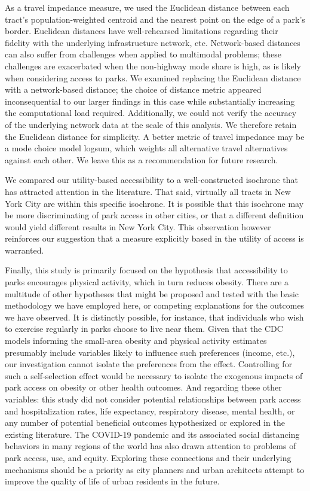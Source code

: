 \documentclass[shortAfour,sageh.bst]{sagej}
\begin{document}
As a travel impedance measure, we used the Euclidean distance between
each tract's population-weighted centroid and the nearest point on the
edge of a park's border. Euclidean distances have well-rehearsed
limitations regarding their fidelity with the underlying infrastructure
network, etc. Network-based distances can also suffer from challenges
when applied to multimodal problems; these challenges are exacerbated
when the non-highway mode share is high, as is likely when considering
access to parks. We examined replacing the Euclidean distance with a
network-based distance; the choice of distance metric appeared
inconsequential to our larger findings in this case while substantially
increasing the computational load required. Additionally, we could not
verify the accuracy of the underlying network data at the scale of this
analysis. We therefore retain the Euclidean distance for simplicity. A
better metric of travel impedance may be a mode choice model logsum,
which weights all alternative travel alternatives against each other. We
leave this as a recommendation for future research.

We compared our utility-based accessibility to a well-constructed
isochrone that has attracted attention in the literature. That said,
virtually all tracts in New York City are within this specific
isochrone. It is possible that this isochrone may be more discriminating
of park access in other cities, or that a different definition would
yield different results in New York City. This observation however
reinforces our suggestion that a measure explicitly based in the utility
of access is warranted.

Finally, this study is primarily focused on the hypothesis that
accessibility to parks encourages physical activity, which in turn
reduces obesity. There are a multitude of other hypotheses that might be
proposed and tested with the basic methodology we have employed here, or
competing explanations for the outcomes we have observed. It is
distinctly possible, for instance, that individuals who wish to exercise
regularly in parks choose to live near them. Given that the CDC models
informing the small-area obesity and physical activity estimates
presumably include variables likely to influence such preferences
(income, etc.), our investigation cannot isolate the preferences from
the effect. Controlling for such a self-selection effect would be
necessary to isolate the exogenous impacts of park access on obesity or
other health outcomes. And regarding these other variables: this study
did not consider potential relationships between park access and
hospitalization rates, life expectancy, respiratory disease, mental
health, or any number of potential beneficial outcomes hypothesized or
explored in the existing literature. The COVID-19 pandemic and its
associated social distancing behaviors in many regions of the world has
also drawn attention to problems of park access, use, and equity.
Exploring these connections and their underlying mechanisms should be a
priority as city planners and urban architects attempt to improve the
quality of life of urban residents in the future.
\end{document}

